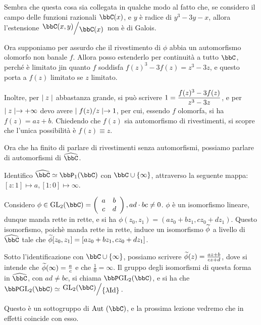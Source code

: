 Sembra che questa cosa sia collegata in qualche modo al fatto che, se considero il campo delle funzioni razionali $\bbC(x)$, e $y$ è radice di $y^3-3y-x$, allora l'estensione $\quotient{\bbC(x,y)}{\bbC(x)}$ non è di Galois.

Ora supponiamo per assurdo che il rivestimento di $\phi$ abbia un automorfismo olomorfo non banale $f$. Allora posso estenderlo per continuità a tutto $\bbC$, perché è limitato jin quanto $f$ soddisfa $f(z)^3-3f(z)=z^3-3z$, e questo porta a $f(z)$ limitato se $z$ limitato.

Inoltre, per $\mid z \mid$ abbastanza grande, si può scrivere $\displaystyle 1=\frac{f(z)^3-3f(z)}{z^3-3z}$, e per $\mid z \mid\rightarrow+\infty$ devo avere $\mid f(z)/z \mid\rightarrow1$, per cui, essendo $f$ olomorfa, si ha $f(z)=az+b$. Chiedendo che $f(z)$ sia automorfismo di rivestimenti, si scopre che l'unica possibilità è $f(z)\equiv z$.

Ora che ha finito di parlare di rivestimenti senza automorfismi, possiamo parlare di automorfismi di $\oc \bbC$.

Identifico $\oc\bbC\isom\bbP_1(\bbC)$ con $\bbC\cup\{\infty\}$, attraverso la seguente mappa: $[z:1]\mapsto a, [1:0]\mapsto\infty$.

Considero $\phi\in\GL_2(\bbC)=\matrice abcd, ad\cdot bc \neq 0$. $\phi$ è un isomorfismo lineare, dunque manda rette in rette, e si ha $\phi(z_0,z_1)=(az_0+bz_1,cz_0+dz_1)$. Questo isomorfismo, poichè manda rette in rette, induce un isomorfismo $\widetilde{\phi}$ a livello di $\oc\bbC$ tale che $\widetilde{\phi}[z_0,z_1]=[az_0+bz_1,cz_0+dz_1]$.

Sotto l'identificazione con $\bbC\cup\{\infty\}$, possiamo scrivere $\widetilde{\phi}(z)=\frac{az+b}{cz+d}$, dove si intende che $\widetilde{\phi}(\infty)=\frac{a}{c}$ e che $\frac{1}{0}=\infty$. Il gruppo degli isomorfismi di questa forma in $\oc \bbC$, con $ad\neq bc$, si chiama $\bbP\GL_2(\bbC)$, e si ha che $\bbP\GL_2(\bbC)\isom\quotient{\GL_2(\bbC)}{\{\lambda\Id\}}$.

Questo è un sottogruppo di $\Aut(\bbC)$, e la prossima lezione vedremo che in effetti coincide con esso.

